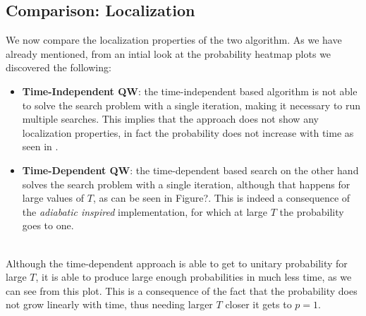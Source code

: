     \subsection{Comparison: Localization}\label{subsec:localization_results}
        We now compare the localization properties of the two algorithm. As we have already mentioned, from an intial look at the probability heatmap plots we discovered the following:
        \begin{itemize}
            \item \textbf{Time-Independent QW}: the time-independent based algorithm is not able to solve the search problem with a single iteration, making it necessary to run multiple searches. This implies that the approach does not show any localization properties, in fact the probability does not increase with time as seen in .
            \item \textbf{Time-Dependent QW}: the time-dependent based search on the other hand solves the search problem with a single iteration, although that happens for large values of $T$, as can be seen in Figure?. This is indeed a consequence of the \textit{adiabatic inspired} implementation, for which at large $T$ the probability goes to one.
        \end{itemize}
        \\
        Although the time-dependent approach is able to get to unitary probability for large $T$, it is able to produce large enough probabilities in much less time, as we can see from this plot. This is a consequence of the fact that the probability does not grow linearly with time, thus needing larger $T$ closer it gets to $p=1$. \\


